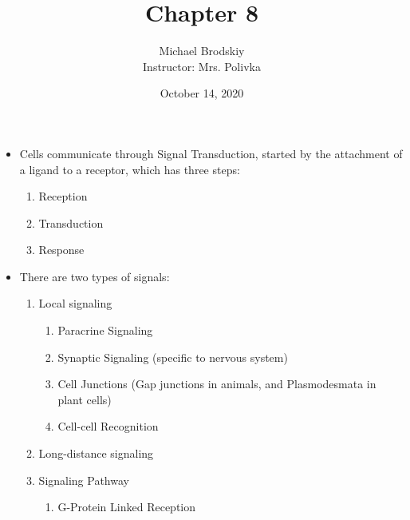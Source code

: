 \documentclass[12pt]{article}
\title{Chapter 8}
\date{October 14, 2020}
\author{Michael Brodskiy\\ \small Instructor: Mrs. Polivka}
\begin{document}
\maketitle

\begin{itemize}

  \item Cells communicate through Signal Transduction, started by the attachment of a ligand to a receptor,  which has three steps:

    \begin{enumerate}

      \item Reception

      \item Transduction

      \item Response

    \end{enumerate}

  \item There are two types of signals:

    \begin{enumerate}

      \item Local signaling

        \begin{enumerate}

          \item Paracrine Signaling

          \item Synaptic Signaling (specific to nervous system)

          \item Cell Junctions (Gap junctions in animals, and Plasmodesmata in plant cells)

          \item Cell-cell Recognition

        \end{enumerate}

      \item Long-distance signaling

      \item Signaling Pathway

        \begin{enumerate}

          \item G-Protein Linked Reception

            \begin{enumerate}


\end{enumerate}
\end{enumerate}
\end{enumerate}
\end{itemize}
\end{document}

